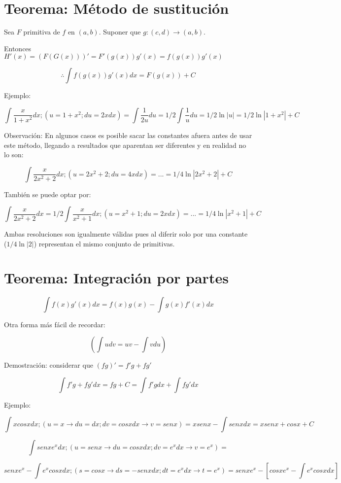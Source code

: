 \documentclass{report}
\begin{document}
	\section{Teorema: Método de sustitución}
		Sea $F$ primitiva de $f$ en $(a,b)$. Suponer que $g:(c,d)\to(a,b)$.
		
		Entonces $H'(x)=(F(G(x)))' = F'(g(x))g'(x) = f(g(x))g'(x)$
		
		$$\therefore \int f(g(x))g'(x)dx = F(g(x))+C$$
		
		Ejemplo:
		
		$$\int\frac{x}{1+x^2}dx ; (u=1+x^2 ; du=2xdx) = \int \frac{1}{2u}du = 1/2 \int\frac{1}{u}du = 1/2 \ln|u| = 1/2 \ln|1+x^2| + C$$
		
		Observación: En algunos casos es posible sacar las constantes afuera antes de usar este método, llegando a resultados que aparentan ser diferentes y en realidad no lo son:
		
		$$\int\frac{x}{2x^2+2}dx ; (u=2x^2+2 ; du=4xdx) = ... = 1/4\ln|2x^2+2|+C$$
		
		También se puede optar por:
		
		$$\int\frac{x}{2x^2+2}dx = 1/2\int\frac{x}{x^2+1}dx; (u=x^2+1 ; du=2xdx) = ... = 1/4\ln|x^2+1|+C$$
		
		Ambas resoluciones son igualmente válidas pues al diferir solo por una constante ($1/4\ln|2|$) representan el mismo conjunto de primitivas.
	
	\section{Teorema: Integración por partes}
		
		$$\int f(x)g'(x)dx = f(x)g(x)-\int g(x)f'(x)dx$$
		
		Otra forma más fácil de recordar:
		
		$$ (\int udv = uv - \int vdu) $$
		
		Demostración: considerar que $(fg)'=f'g+fg'$
		
		$$\int f'g+fg'dx=fg+C=\int f'gdx + \int fg'dx$$
		
		Ejemplo:
		
		$$\int xcosxdx ; (u=x \rightarrow du=dx ; dv=cosxdx \rightarrow v = senx) = xsenx-\int senxdx=xsenx+cosx+C$$
		
		$$\int senx e^x dx ; (u=senx \rightarrow du=cosxdx ; dv=e^xdx \rightarrow v=e^x) = $$
		
		$$senxe^x - \int e^xcosxdx ; (s=cosx \rightarrow ds=-senxdx ; dt=e^xdx \rightarrow t=e^x) = senxe^x-[cosxe^x-\int e^xcosxdx]$$
		
\end{document}
